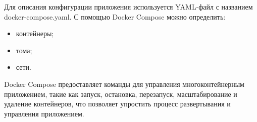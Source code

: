 Для описания конфигурации приложения используется YAML-файл с названием docker-compose.yaml.
С помощью Docker Compose можно определить:
\begin{itemize}
    \item контейнеры;
    \item тома;
    \item сети.
\end{itemize}

Docker Compose предоставляет команды для управления многоконтейнерным приложением, такие как запуск, остановка, перезапуск, масштабирование и удаление контейнеров,
что позволяет упростить процесс развертывания и управления приложением.







